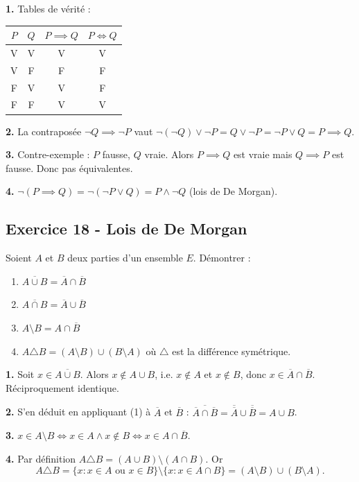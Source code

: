 \documentclass[12pt,a4paper]{article}
\begin{document}
\begin{boitecorrige}
\textbf{1.} Tables de vérité :
\begin{center}
\renewcommand{\arraystretch}{1.2}
\begin{tabular}{|c|c|c|c|}
\hline
$P$ & $Q$ & $P\implies Q$ & $P\iff Q$\\
\hline
V & V & V & V\\
V & F & F & F\\
F & V & V & F\\
F & F & V & V\\
\hline
\end{tabular}
\end{center}

\textbf{2.} La contraposée $\neg Q \implies \neg P$ vaut $\neg(\neg Q)\vee\neg P = Q \vee \neg P = \neg P \vee Q = P\implies Q$.

\textbf{3.} Contre-exemple : $P$ fausse, $Q$ vraie. Alors $P\implies Q$ est vraie mais $Q\implies P$ est fausse. Donc pas équivalentes.

\textbf{4.} $\neg(P\implies Q) = \neg(\neg P \vee Q) = P \wedge \neg Q$ (lois de De Morgan).
\end{boitecorrige}

\subsection*{Exercice 18 - Lois de De Morgan \niveau{\facile}}

\begin{boiteexercice}
Soient $A$ et $B$ deux parties d'un ensemble $E$. Démontrer :
\begin{enumerate}
  \item $\overline{A\cup B} = \overline{A}\cap\overline{B}$
  \item $\overline{A\cap B} = \overline{A}\cup\overline{B}$
  \item $A\setminus B = A\cap\overline{B}$
  \item $A\triangle B = (A\setminus B)\cup(B\setminus A)$ où $\triangle$ est la différence symétrique.
\end{enumerate}
\end{boiteexercice}

\begin{boitecorrige}
\textbf{1.} Soit $x\in\overline{A\cup B}$. Alors $x\notin A\cup B$, i.e. $x\notin A$ et $x\notin B$, donc $x\in\overline A\cap\overline B$. Réciproquement identique.

\textbf{2.} S'en déduit en appliquant (1) à $\overline A$ et $\overline B$ : $\overline{\overline A\cap\overline B} = \overline{\overline A}\cup\overline{\overline B} = A\cup B$.

\textbf{3.} $x\in A\setminus B \iff x\in A\wedge x\notin B \iff x\in A\cap\overline B$.

\textbf{4.} Par définition $A\triangle B = (A\cup B)\setminus(A\cap B)$. Or
\[
A\triangle B = \{x : x\in A \text{ ou } x\in B\}\setminus\{x : x\in A\cap B\} = (A\setminus B)\cup(B\setminus A).
\]
\end{boitecorrige}
\end{document}
